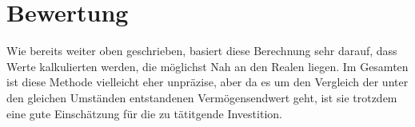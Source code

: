 \section{Bewertung}

Wie bereits weiter oben geschrieben, basiert diese Berechnung sehr darauf, dass Werte kalkulierten werden, die möglichst Nah an den Realen liegen. Im Gesamten ist diese Methode vielleicht eher unpräzise, aber da es um den Vergleich der unter den gleichen Umständen entstandenen Vermögensendwert geht, ist sie trotzdem eine gute Einschätzung für die zu tätitgende Investition.
